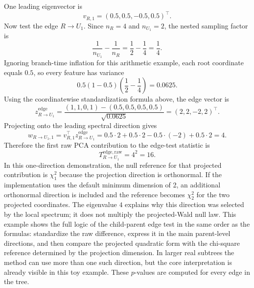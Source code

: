 One leading eigenvector is
\begin{equation}
v_{R,1} = (0.5,0.5,-0.5,0.5)^\top.
\end{equation}
Now test the edge $R \to U_1$. Since $n_R=4$ and $n_{U_1}=2$, the nested
sampling factor is
\begin{equation}
\frac{1}{n_{U_1}} - \frac{1}{n_R} = \frac{1}{2} - \frac{1}{4} = \frac{1}{4}.
\end{equation}
Ignoring branch-time inflation for this arithmetic example, each root
coordinate equals $0.5$, so every feature has variance
\begin{equation}
0.5(1-0.5)\left(\frac{1}{2}-\frac{1}{4}\right)=0.0625.
\end{equation}
Using the coordinatewise standardization formula above, the edge vector is
\begin{equation}
z_{R \to U_1}^{\mathrm{edge}}
=
\frac{(1,1,0,1)-(0.5,0.5,0.5,0.5)}{\sqrt{0.0625}}
=
(2,2,-2,2)^\top.
\end{equation}
Projecting onto the leading spectral direction gives
\begin{equation}
w_{R \to U_1,1}
=
v_{R,1}^\top z_{R \to U_1}^{\mathrm{edge}}
=
0.5\cdot 2 + 0.5\cdot 2 - 0.5\cdot (-2) + 0.5\cdot 2
=
4.
\end{equation}
Therefore the first raw PCA contribution to the edge-test statistic is
\begin{equation}
T_{R \to U_1}^{\mathrm{edge,raw}}
=
4^2
=
16.
\end{equation}
In this one-direction demonstration, the null reference for that projected
contribution is $\chi^2_1$ because the projection direction is orthonormal.
If the implementation uses the default minimum dimension of 2, an additional
orthonormal direction is included and the reference becomes $\chi^2_2$ for the
two projected coordinates. The eigenvalue $4$ explains why this direction was
selected by the local spectrum; it does not multiply the projected-Wald null
law.
This example shows the full logic of the child-parent edge test in the same
order as the formulas: standardize the raw difference, express it in the main
parent-level directions, and then compare the projected quadratic form with
the chi-square reference determined by the projection dimension.
In larger real subtrees the method can use more than one such
direction, but the core interpretation is already visible in this toy example.
These $p$-values are computed for every edge in the tree.
